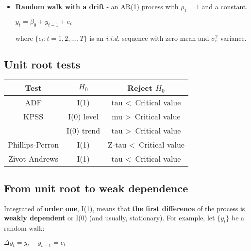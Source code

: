 \documentclass[10pt, a4paper, landscape]{article}
\begin{document}
\begin{multicols}{3}
\begin{itemize}[leftmargin=*]
			\item \textbf{Random walk with a drift} - an AR(1) process with $\rho_{1} = 1$ and a constant.
			
			\begin{center}
				$y_{t} = \beta_{0} + y_{t - 1} + e_{t}$
			\end{center}
			
			where $\lbrace e_{t} : t = 1, 2, \ldots, T \rbrace$ is an \textsl{i.i.d.} sequence with zero mean and $\sigma^{2}_{e}$ variance.
		\end{itemize}
		
		\subsection*{Unit root tests}
		
		\begin{center}
			\begin{tabular}{| c | c | c |}
				\hline
				\textbf{Test}   & $H_{0}$    & \textbf{Reject} $H_{0}$            \\ \hline
				ADF             & I(1)       & tau \textless \, Critical value    \\ \hline
				KPSS            & I(0) level & mu \textgreater \, Critical value  \\
				                & I(0) trend & tau \textgreater \, Critical value \\ \hline
				Phillips-Perron & I(1)       & Z-tau \textless \, Critical value  \\ \hline
				Zivot-Andrews   & I(1)       & tau \textless \, Critical value    \\ \hline
			\end{tabular}
		\end{center}
		
		\subsection*{From unit root to weak dependence}
		
		Integrated of \textbf{order one}, I(1), means that \textbf{the first difference} of the process is \textbf{weakly dependent} or I(0) (and usually, stationary). For example, let $\lbrace y_{t} \rbrace$ be a random walk:
		
		\begin{multicols}{2}
			\begin{center}
				$\Delta y_{t} = y_{t} - y_{t - 1} = e_{t}$
			\end{center}
			

\end{multicols}
\end{multicols}
\end{document}
